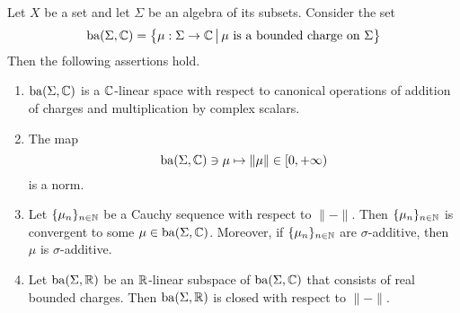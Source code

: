 \begin{theorem}\label{theorem:space_of_bounded_complex_charges}
    Let $X$ be a set and let $\Sigma$ be an algebra of its subsets. Consider the set
    $$\mathrm{ba}(\Sigma, {\mathbb C}) = \big\{\mu:\Sigma \rightarrow {\mathbb C}\,\big|\,\mu\mbox{ is a bounded charge on }\Sigma\big\}$$
    Then the following assertions hold.
    \begin{enumerate}[label=\emph{\textbf{(\arabic*)}}, leftmargin=*]
        \item $\mathrm{ba}(\Sigma, {\mathbb C})$ is a ${\mathbb C}$-linear space with respect to canonical operations of addition of charges and multiplication by complex scalars.
        \item The map
              $$\mathrm{ba}(\Sigma, {\mathbb C}) \ni \mu \mapsto \lVert \mu\rVert \in [0,+\infty)$$
              is a norm.
        \item Let $\{\mu_n\}_{n\in {\mathbb N}}$ be a Cauchy sequence with respect to $\lVert-\rVert$. Then $\{\mu_n\}_{n\in {\mathbb N}}$ is convergent to some $\mu \in \mathrm{ba}(\Sigma, {\mathbb C})$. Moreover, if $\{\mu_n\}_{n\in {\mathbb N}}$ are $\sigma$-additive, then $\mu$ is $\sigma$-additive.
        \item Let $\mathrm{ba}(\Sigma,{\mathbb R})$ be an ${\mathbb R}$-linear subspace of $\mathrm{ba}(\Sigma, {\mathbb C})$ that consists of real bounded charges. Then $\mathrm{ba}(\Sigma,{\mathbb R})$ is closed with respect to $\lVert-\rVert$.
    \end{enumerate}
\end{theorem}
